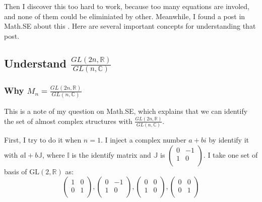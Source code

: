 \documentclass{article}
\numberwithin{equation}{subsection} %
\theoremstyle{definition}
\begin{document}
Then I discover this too hard to work, because too many equations are
involed, and none of them could be eliminiated by other. Meanwhile, I
found a post in Math.SE about this \cite{math.se_1}. Here are several
important concepts for understanding that post.

    \subsection{Understand \texorpdfstring{ 
                    $\frac{GL(2n,\mathbb{R})}
                        {GL(n,\mathbb{C})}$
                            }{}
                }
    \label{sec:Understand_GL(2n,R)/GL(n,C)}

        \subsubsection{Why \texorpdfstring{$M_n = \frac{GL(2n,\mathbb{R})}
            {GL(n,\mathbb{C})}$}{}}

        This is a note of my question on Math.SE\cite{math.se_3}, which
        explains that we can identify the set of almost complex structures
        with $\frac{GL(2n,\mathbb{R})}{GL(n,\mathbb{C})}$.

        First, I try to do it when $n=1$. I inject a complex number 
        $a+bi$ by
        identify it with $a\mathbb{I}+b\mathbb{J}$, where $\mathbb{I}$ 
        is the identify matrix and $\mathbb{J}$ is
        $ \left(
        \begin{array}{cc}
         0 & -1 \\
         1 & 0 \\
        \end{array}
        \right) $. I take one set of basis of 
        $\mathrm{GL}(2,\mathbb{R})$ as:
        $$
        \left(
        \begin{array}{cc}
         1 & 0 \\
         0 & 1 \\
        \end{array}
        \right),\left(
        \begin{array}{cc}
         0 & -1 \\
         1 & 0 \\
        \end{array}
        \right),\left(
        \begin{array}{cc}
         0 & 0 \\
         1 & 0 \\
        \end{array}
        \right),\left(
        \begin{array}{cc}
         0 & 0 \\
         0 & 1 \\
        \end{array}
        \right)
        $$
\end{document}
